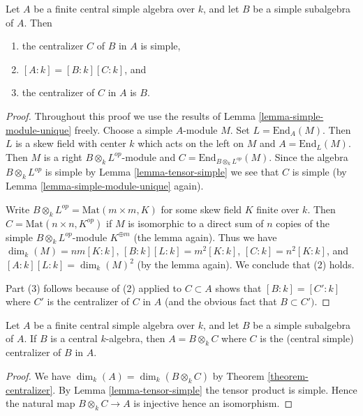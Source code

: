 \begin{theorem}
\label{theorem-centralizer}
Let $A$ be a finite central simple algebra over $k$, and let
$B$ be a simple subalgebra of $A$. Then
\begin{enumerate}
\item the centralizer $C$ of $B$ in $A$ is simple,
\item $[A : k] = [B : k][C : k]$, and
\item the centralizer of $C$ in $A$ is $B$.
\end{enumerate}
\end{theorem}

\begin{proof}
Throughout this proof we use the results of
Lemma \ref{lemma-simple-module-unique} freely.
Choose a simple $A$-module $M$. Set $L = \text{End}_A(M)$.
Then $L$ is a skew field with center $k$ which acts on the left on $M$
and $A = \text{End}_L(M)$.
Then $M$ is a right $B \otimes_k L^{op}$-module and
$C = \text{End}_{B \otimes_k L^{op}}(M)$.
Since the algebra $B \otimes_k L^{op}$ is simple by
Lemma \ref{lemma-tensor-simple} we see that $C$ is simple (by
Lemma \ref{lemma-simple-module-unique} again).

\medskip\noindent
Write $B \otimes_k L^{op} = \text{Mat}(m \times m, K)$ for some
skew field $K$ finite over $k$. Then $C = \text{Mat}(n \times n, K^{op})$
if $M$ is isomorphic to a direct sum of $n$ copies of the simple
$B \otimes_k L^{op}$-module $K^{\oplus m}$ (the lemma again). Thus we have
$\dim_k(M) = nm [K : k]$, $[B : k] [L : k] = m^2 [K : k]$,
$[C : k] = n^2 [K : k]$, and $[A : k] [L : k] = \dim_k(M)^2$ (by
the lemma again). We conclude that (2) holds.

\medskip\noindent
Part (3) follows because of (2) applied to $C \subset A$ shows
that $[B : k] = [C' : k]$ where $C'$ is the centralizer of $C$ in $A$
(and the obvious fact that $B \subset C')$.
\end{proof}

\begin{lemma}
\label{lemma-when-tensor-is-equal}
Let $A$ be a finite central simple algebra over $k$, and let
$B$ be a simple subalgebra of $A$. If $B$ is a central
$k$-algebra, then $A = B \otimes_k C$ where $C$ is the (central simple)
centralizer of $B$ in $A$.
\end{lemma}

\begin{proof}
We have $\dim_k(A) = \dim_k(B \otimes_k C)$ by
Theorem \ref{theorem-centralizer}. By
Lemma \ref{lemma-tensor-simple}
the tensor product is simple. Hence the natural map
$B \otimes_k C \to A$ is injective hence an isomorphism.
\end{proof}

